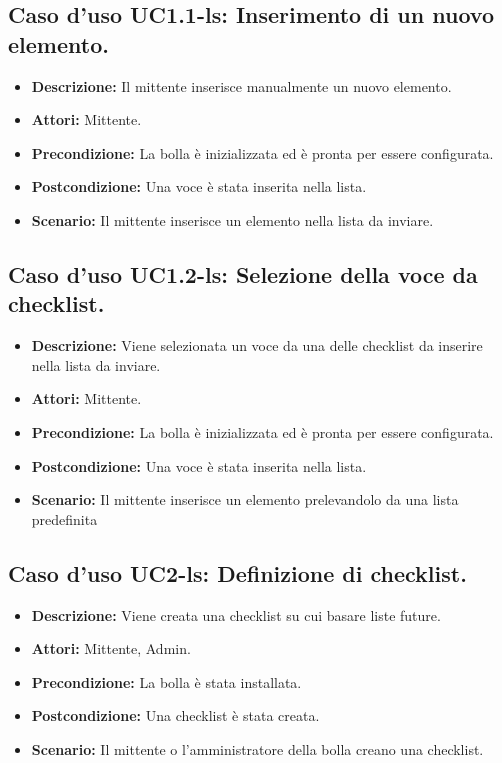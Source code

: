 \subsection{Caso d'uso UC1.1-ls: Inserimento di un nuovo elemento.}
\begin{itemize}
\item[]\textbf{Descrizione:} Il mittente inserisce manualmente un nuovo elemento.
\item[]\textbf{Attori:} Mittente. 
\item[]\textbf{Precondizione:} La bolla è inizializzata ed è pronta per essere configurata. 
\item[]\textbf{Postcondizione:} Una voce è stata inserita nella lista. 
\item[]\textbf{Scenario:}
Il mittente inserisce un elemento nella lista da inviare. 
\end{itemize}

\subsection{Caso d'uso UC1.2-ls: Selezione della voce da checklist.}
\begin{itemize}
\item[]\textbf{Descrizione:} Viene selezionata un voce da una delle checklist da inserire nella lista da inviare.
\item[]\textbf{Attori:} Mittente. 
\item[]\textbf{Precondizione:} La bolla è inizializzata ed è pronta per essere configurata. 
\item[]\textbf{Postcondizione:} Una voce è stata inserita nella lista. 
\item[]\textbf{Scenario:}
Il mittente inserisce un elemento prelevandolo da una lista predefinita 
\end{itemize}

\subsection{Caso d'uso UC2-ls: Definizione di checklist.}
\begin{itemize}
\item[]\textbf{Descrizione:} Viene creata una checklist su cui basare liste future.
\item[]\textbf{Attori:} Mittente, Admin. 
\item[]\textbf{Precondizione:} La bolla è stata installata. 
\item[]\textbf{Postcondizione:} Una checklist è stata creata. 
\item[]\textbf{Scenario:}
Il mittente o l'amministratore della bolla creano una checklist. 
\end{itemize}

